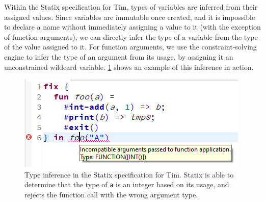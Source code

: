 Within the Statix specification for Tim, types of variables are inferred from their assigned values. Since variables are immutable once created, and it is impossible to declare a name without immediately assigning a value to it (with the exception of function arguments), we can directly infer the type of a variable from the type of the value assigned to it. For function arguments, we use the constraint-solving engine to infer the type of an argument from its usage, by assigning it an unconstrained wildcard variable. \cref{fig:tim_statix_inference} shows an example of this inference in action.\\






\begin{figure}
  \centering
  \includegraphics{img/tim_stx_inference.png}
  \caption{Type inference in the Statix specification for Tim. Statix is able to determine that the type of \texttt{a} is an integer based on its usage, and rejects the function call with the wrong argument type.}
  \label{fig:tim_statix_inference}
\end{figure}

